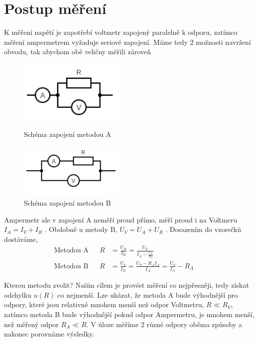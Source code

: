 \documentclass[a4paper,11pt]{article}
\begin{document}
\section{Postup měření} 

K měření napětí je zapotřebí voltmetr zapojený paralelně k odporu, zatímco měření ampermetrem vyžaduje seriové zapojení.
Máme tedy 2 možnosti navržení obvodu, tak abychom obě veličny měřili zároveň

\begin{figure}[htbp]
  \begin{minipage}[t]{0.45\textwidth}
    \centering
    \includegraphics[width=5cm]{circuitA.png}
    \caption{Schéma zapojení metodou A}%
  \end{minipage}
  \hfil
  \begin{minipage}[t]{0.45\textwidth}
    \centering
    \includegraphics[width=5cm]{circuitB.png}
    \caption{Schéma zapojení metodou B}%
  \end{minipage}
\end{figure}

Ampermetr ale v zapojení A neměří proud přímo, měří proud i na Voltmeru $I_A = I_V + I_R$ . 
Obdobně u metody B, $U_V = U_A + U_R$ . Dosazením do vzorečků dostáváme, \\

\begin{align}
  \label{eq:2}
  \text{Metodou A} & & R &= \frac{U_R}{I_R} = \frac{U_V}{I_A - \frac{U_V}{R_V}} & & \\[5pt]
  \label{eq:3}
  \text{Metodou B} & & R &= \frac{U_V}{I_R} = \frac{U_V - R_AI_A}{I_A} = \frac{U_V}{I_A} - R_A & &
\end{align}

Kterou metodu zvolit? Naším cílem je provést měření co nejpřesněji, tedy získat odchylku $u(R)$ co nejmenší.
Lze ukázat, že metoda A bude výhodnější pro odpory, které jsou relativně mnohem menší než odpor Voltmetru, $R \ll R_V$, 
zatímco metoda B bude výhodnější pokud odpor Ampermetru, je mnohem menší, než měřený odpor $R_A \ll R$. 
V úloze měříme 2 různé odpory oběma způsoby a nakonec porovnáme výsledky. \\
\end{document}
